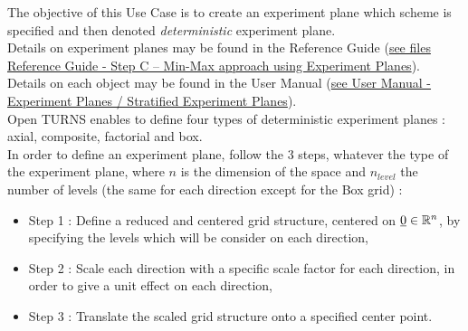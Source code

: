\renewcommand{\filename}{docUC_MinMax_DetExperimentPlane.tex}
\renewcommand{\filetitle}{UC : Creation of a deterministic experiment plane : Axial, Box, Composite, Factorial patterns}

\HeaderIIILevel

\label{determExpPlane}




The objective of this Use Case is to create an experiment plane which scheme is specified and then denoted {\itshape deterministic} experiment plane.\\


Details on experiment planes  may be found in the Reference Guide (\href{OpenTURNS_ReferenceGuide.pdf}{see files Reference Guide - Step C -- Min-Max approach using Experiment Planes}).\\

Details on each object may be found in the User Manual  (\href{OpenTURNS_UserManual_TUI.pdf}{see User Manual - Experiment Planes / Stratified Experiment Planes}).\\


Open TURNS enables to define four types of deterministic experiment planes : axial, composite, factorial and box.\\

In order to define an experiment plane, follow the 3  steps, whatever the type of the experiment plane, where $n$ is the dimension of the space and $n_{level}$ the number of levels (the same for each direction except for the Box grid) :
\begin{itemize}
\item Step 1 : Define a reduced and centered grid structure, centered on ${\underline{0}} \in \mathbb{R}^n$, by specifying the levels which will be consider on each direction,
\item Step 2 : Scale each direction with a specific scale factor for each direction, in order to give a unit effect on each direction,
\item Step 3 : Translate the scaled grid structure onto a specified center point.
\end{itemize}

